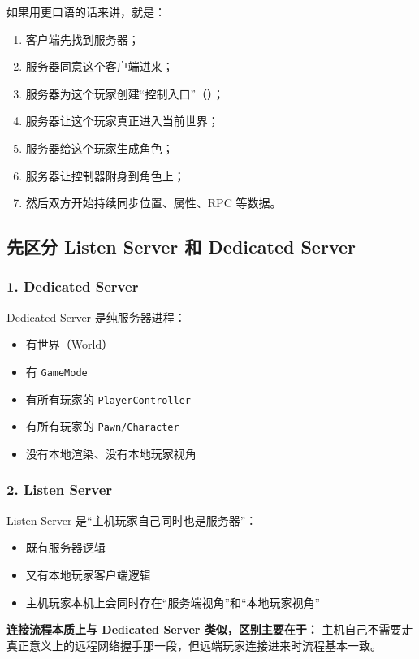 如果用更口语的话来讲，就是：

\begin{enumerate}
	\item 客户端先找到服务器；
	\item 服务器同意这个客户端进来；
	\item 服务器为这个玩家创建“控制入口”（）；
	\item 服务器让这个玩家真正进入当前世界；
	\item 服务器给这个玩家生成角色；
	\item 服务器让控制器附身到角色上；
	\item 然后双方开始持续同步位置、属性、RPC 等数据。
\end{enumerate}


\subsection{先区分 Listen Server 和 Dedicated Server}

\subsubsection{1. Dedicated Server}
Dedicated Server 是纯服务器进程：
\begin{itemize}
	\item 有世界（World）
	\item 有 \texttt{GameMode}
	\item 有所有玩家的 \texttt{PlayerController}
	\item 有所有玩家的 \texttt{Pawn/Character}
	\item 没有本地渲染、没有本地玩家视角
\end{itemize}
\subsubsection{2. Listen Server}
Listen Server 是“主机玩家自己同时也是服务器”：

\begin{itemize}
	\item 既有服务器逻辑
	\item 又有本地玩家客户端逻辑
	\item 主机玩家本机上会同时存在“服务端视角”和“本地玩家视角”
\end{itemize}

\textbf{连接流程本质上与 Dedicated Server 类似，区别主要在于：}
主机自己不需要走真正意义上的远程网络握手那一段，但远端玩家连接进来时流程基本一致。


